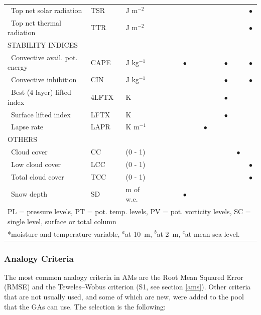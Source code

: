\documentclass[draft]{agujournal2019}
\begin{document}
\begin{table}[!htbp]
{\begin{tabular}{lll|cccc|cccc|cc}
		\ Top net solar radiation & TSR & J m$^{-2}$ &  &  &  &  &  &  &  & & & $\bullet$ \\
		\ Top net thermal radiation & TTR & J m$^{-2}$ &  &  &  &  &  &  &  & & & $\bullet$ \\
		\hline
		\multicolumn{3}{l|}{\uppercase{Stability indices}} & & & & & & & & & & \\
		\ Convective avail. pot. energy & CAPE & J kg$^{-1}$ &  &  &  & $\bullet$ &  &  &  & $\bullet$ & & $\bullet$ \\
		\ Convective inhibition & CIN & J kg$^{-1}$ &  &  &  &  &  &  &  & $\bullet$ & & $\bullet$ \\
		\ Best (4 layer) lifted index & 4LFTX & K &  &  &  &  &  &  &  & $\bullet$ & & \\
		\ Surface lifted index & LFTX & K &  &  &  &  &  &  &  & $\bullet$ & & \\
		\ Lapse rate & LAPR & K m$^{-1}$ &  &  &  &  &  & $\bullet$ &  &  & & \\
		\hline
		\multicolumn{3}{l|}{\uppercase{Others}} & & & & & & & & & & \\
		\ Cloud cover & CC & (0 - 1) &  &  &  &  &  &  &  &  & $\bullet$ & \\
		\ Low cloud cover & LCC & (0 - 1) &  &  &  &  &  &  &  &  & & $\bullet$ \\
		\ Total cloud cover & TCC & (0 - 1) &  &  &  &  &  &  &  &  &  & $\bullet$ \\
		\ Snow depth & SD & m of w.e. &  &  &  & $\bullet$ &  &  &  &  & & \\
		\hline
		\multicolumn{13}{l}{PL = pressure levels, PT = pot. temp. levels, PV = pot. vorticity levels, SC = single level, surface or total column} \\
		\multicolumn{13}{l}{*moisture and temperature variable, $^{a}$at 10~m, $^{b}$at 2~m, $^{c}$at mean sea level.}\\
		\hline 
	\end{tabular}}
	\label{list_variables}
\end{table}


\subsubsection{Analogy Criteria}
\label{criteria}

The most common analogy criteria in AMs are the Root Mean Squared Error (RMSE) and the Teweles--Wobus criterion (S1, see section \ref{ams}). Other criteria that are not usually used, and some of which are new, were added to the pool that the GAs can use. The selection is the following:
\end{document}
